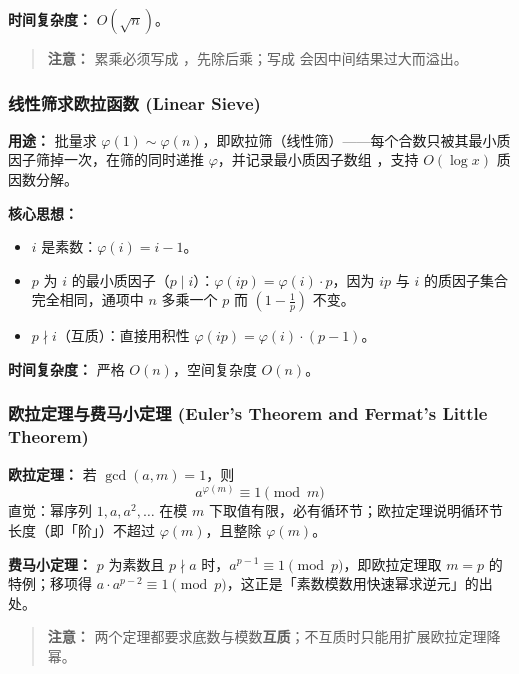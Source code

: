 \textbf{时间复杂度：} $O(\sqrt{n})$。



\begin{quote}
\textbf{注意：} 累乘必须写成 ，先除后乘；写成  会因中间结果过大而溢出。
\end{quote}

\subsubsection{线性筛求欧拉函数 (Linear Sieve)}

\textbf{用途：}
批量求 $\varphi(1) \sim \varphi(n)$，即欧拉筛（线性筛）——每个合数只被其最小质因子筛掉一次，在筛的同时递推 $\varphi$，并记录最小质因子数组 ，支持 $O(\log x)$ 质因数分解。

\textbf{核心思想：}
\begin{itemize}
    \item $i$ 是素数：$\varphi(i) = i - 1$。
    \item $p$ 为 $i$ 的最小质因子（$p \mid i$）：$\varphi(ip) = \varphi(i) \cdot p$，因为 $ip$ 与 $i$ 的质因子集合完全相同，通项中 $n$ 多乘一个 $p$ 而 $\left(1 - \frac{1}{p}\right)$ 不变。
    \item $p \nmid i$（互质）：直接用积性 $\varphi(ip) = \varphi(i) \cdot (p-1)$。
\end{itemize}

\textbf{时间复杂度：} 严格 $O(n)$，空间复杂度 $O(n)$。



\subsubsection{欧拉定理与费马小定理 (Euler's Theorem and Fermat's Little Theorem)}

\textbf{欧拉定理：} 若 $\gcd(a, m) = 1$，则
\[
a^{\varphi(m)} \equiv 1 \pmod{m}
\]
直觉：幂序列 $1, a, a^{2}, \dots$ 在模 $m$ 下取值有限，必有循环节；欧拉定理说明循环节长度（即「阶」）不超过 $\varphi(m)$，且整除 $\varphi(m)$。

\textbf{费马小定理：} $p$ 为素数且 $p \nmid a$ 时，$a^{p-1} \equiv 1 \pmod{p}$，即欧拉定理取 $m = p$ 的特例；移项得 $a \cdot a^{p-2} \equiv 1 \pmod{p}$，这正是「素数模数用快速幂求逆元」的出处。

\begin{quote}
\textbf{注意：} 两个定理都要求底数与模数\textbf{互质}；不互质时只能用扩展欧拉定理降幂。
\end{quote}

